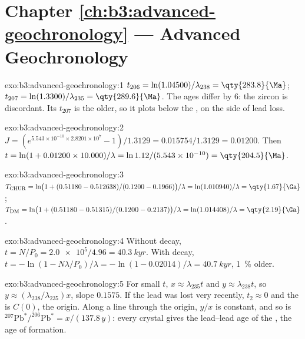 \section*{Chapter \ref{ch:b3:advanced-geochronology} --- Advanced Geochronology}

\begin{solution}{exo:b3:advanced-geochronology:1}
$t_{206} = \ln(1.04500)/\lambda_{238} = \qty{283.8}{\Ma}$; $t_{207} =
\ln(1.3300)/\lambda_{235} = \qty{289.6}{\Ma}$. The ages differ by
\qty{6}{\Ma}: the zircon is discordant. Its $t_{207}$ is the older, so it plots
below the , on the side of lead loss.
\end{solution}

\begin{solution}{exo:b3:advanced-geochronology:2}
$J = (e^{5.543\times10^{-10}\times2.8201\times10^7} - 1)/1.3129 =
0.015754/1.3129 = 0.01200$. Then $t = \ln(1 + 0.01200\times10.000)/\lambda =
\ln 1.12/(5.543\times10^{-10}) = \qty{204.5}{\Ma}$.
\end{solution}

\begin{solution}{exo:b3:advanced-geochronology:3}
$T_{\mathrm{CHUR}} = \ln\bigl(1 + (0.51180 - 0.512638)/(0.1200 -
0.1966)\bigr)/\lambda = \ln(1.010940)/\lambda = \qty{1.67}{\Ga}$;
$T_{\mathrm{DM}} = \ln\bigl(1 + (0.51180 - 0.51315)/(0.1200 - 0.2137)\bigr)/\lambda
= \ln(1.014408)/\lambda = \qty{2.19}{\Ga}$.
\end{solution}

\begin{solution}{exo:b3:advanced-geochronology:4}
Without decay, $t = N/P_0 = \num{2.0e5}/4.96 = \qty{40.3}{kyr}$. With decay,
$t = -\ln(1 - N\lambda/P_0)/\lambda = -\ln(1 - 0.02014)/\lambda =
\qty{40.7}{kyr}$, \qty{1}{\percent} older.
\end{solution}

\begin{solution}{exo:b3:advanced-geochronology:5}
For small $t$, $x \approx \lambda_{235}t$ and $y \approx \lambda_{238}t$, so
$y \approx (\lambda_{238}/\lambda_{235})x$, slope $0.1575$. If the lead was
lost very recently, $t_2 \approx 0$ and the  is $C(0)$, the
origin. Along a line through the origin, $y/x$ is constant, and so is
$^{207}\mathrm{Pb}^*/^{206}\mathrm{Pb}^* = x/(137.8\,y)$: every crystal gives
the lead--lead age of the , the age of formation.
\end{solution}

